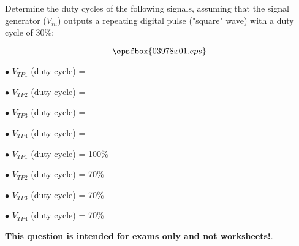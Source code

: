 

Determine the duty cycles of the following signals, assuming that the signal generator ($V_{in}$) outputs a repeating digital pulse ("square" wave) with a duty cycle of 30\%:

$$\epsfbox{03978x01.eps}$$

\medskip
\item{$\bullet$} $V_{TP1}$ (duty cycle) = 
\vskip 5pt
\item{$\bullet$} $V_{TP2}$ (duty cycle) = 
\vskip 5pt
\item{$\bullet$} $V_{TP3}$ (duty cycle) = 
\vskip 5pt
\item{$\bullet$} $V_{TP4}$ (duty cycle) = 
\medskip







\medskip
\item{$\bullet$} $V_{TP1}$ (duty cycle) = 100\%
\vskip 5pt
\item{$\bullet$} $V_{TP2}$ (duty cycle) = 70\%
\vskip 5pt
\item{$\bullet$} $V_{TP3}$ (duty cycle) = 70\%
\vskip 5pt
\item{$\bullet$} $V_{TP4}$ (duty cycle) = 70\%
\medskip







{\bf This question is intended for exams only and not worksheets!}.




